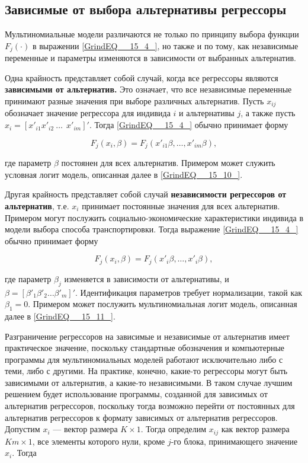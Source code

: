 \subsection{Зависимые от выбора альтернативы регрессоры}

Мультиномиальные модели различаются не только по принципу выбора функции $F_j(\cdot )$ в выражении \eqref{GrindEQ__15_4_}, но также и по тому, как  независимые переменные и параметры изменяются в зависимости от выбранных альтернатив.

Одна крайность представляет собой случай, когда все регрессоры являются \textbf{зависимыми от альтернатив.} Это означает, что все независимые переменные принимают разные значения при выборе различных альтернатив. Пусть $x_{ij}$ обозначает значение регрессора для индивида $i$ и альтернативы $j$, а также пусть $x_i={\left[x'_{i1}x'_{i2}\ \dots \ \ x'_{im}\right]}'.$ Тогда \eqref{GrindEQ__15_4_} обычно принимает форму

\[F_j\left(x_i,\beta \right)=F_j\left(x'_{i1}\beta ,\dots ,x'_{im}\beta \right),\] 

где параметр $\beta $ постоянен для всех альтернатив. Примером может служить условная логит модель, описанная далее в \eqref{GrindEQ__15_10_}.

Другая крайность представляет собой случай \textbf{независимости регрессоров от альтернатив}, т.е. $x_i$ принимает постоянные значения для всех альтернатив. Примером могут послужить социально-экономические характеристики индивида в модели выбора способа транспортировки. Тогда выражение \eqref{GrindEQ__15_4_} обычно принимает форму

\[F_j\left(x_i,\beta \right)=F_j\left(x'_i\beta ,\dots ,x'_i\beta \right),\] 

где параметр ${\beta }_j$ изменяется в зависимости от альтернативы, и $\beta ={\left[{\beta }'_1{\beta }'_2\dots {\beta }'_m\right]}'.$ Идентификация параметров требует нормализации, такой как ${\beta }_1=0.$ Примером может послужить мультиномиальная  логит модель, описанная далее в \eqref{GrindEQ__15_11_}.

Разграничение регрессоров на зависимые и независимые от альтернатив имеет практическое значение, поскольку стандартные обозначения и компьютерные программы для мультиномиальных моделей работают исключительно либо с теми, либо с другими. На практике, конечно, какие-то регрессоры могут быть зависимыми от альтернатив, а какие-то независимыми. В таком случае лучшим решением будет использование программы, созданной для зависимых от альтернатив регрессоров, поскольку тогда возможно перейти от постоянных для альтернатив регрессоров к формату зависимых от альтернатив регрессоров. Допустим $x_i$ --- вектор размера $K\times 1$. Тогда определим $x_{ij}$ как вектор размера $Km\times 1$, все элементы которого нули, кроме $j$-го блока, принимающего значение $x_i$. Тогда 

